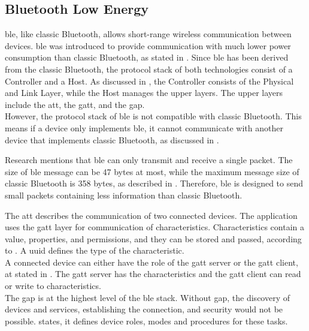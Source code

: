 \subsection{Bluetooth Low Energy}
\gls{ble}, like classic Bluetooth, allows short-range wireless communication between devices. \gls{ble} was introduced to provide communication with much lower power consumption than classic Bluetooth, as stated in \cite{GomezOP12}. Since \gls{ble} has been derived from the classic Bluetooth, the protocol stack of both technologies consist of a Controller and a Host. As discussed in \cite{GomezOP12}, the Controller consists of the Physical and Link Layer, while the Host manages the upper layers. The upper layers include the \gls{att}, the \gls{gatt}, and the \gls{gap}. \\
However, the protocol stack of \gls{ble} is not compatible with classic Bluetooth. This means if a device only implements \gls{ble}, it cannot communicate with another device that implements classic Bluetooth, as discussed in \cite{GomezOP12}.

Research \cite{Ryan13} mentions that \gls{ble} can only transmit and receive a single packet. The size of \gls{ble} message can be 47 bytes at most, while the maximum message size of classic Bluetooth is 358 bytes, as described in \cite{GomezOP12}. Therefore, \gls{ble} is designed to send small packets containing less information than classic Bluetooth.

The \gls{att} describes the communication of two connected devices. The application uses the \gls{gatt} layer for communication of characteristics. Characteristics contain a value, properties, and permissions, and they can be stored and passed, according to \cite{BTGatt}. A \gls{uuid} defines the type of the characteristic. \\
A connected device can either have the role of the \gls{gatt} server or the \gls{gatt} client, at stated in \cite{TIGatt}. The \gls{gatt} server has the characteristics and the \gls{gatt} client can read or write to characteristics. \\
The \gls{gap} is at the highest level of the \gls{ble} stack. Without \gls{gap}, the discovery of devices and services, establishing the connection, and security would not be possible. \cite{GomezOP12} states, it defines device roles, modes and procedures for these tasks.


